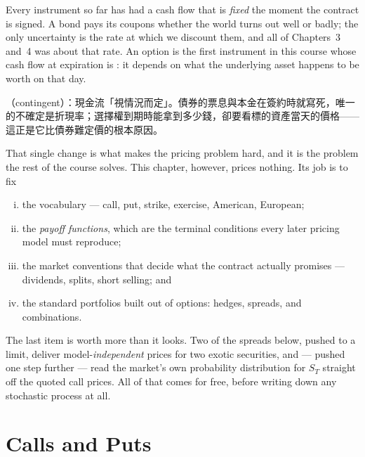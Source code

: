 \bigskip

\suppstart
\noindent Every instrument so far has had a cash flow that is \emph{fixed} the moment the contract is signed.
A bond pays its coupons whether the world turns out well or badly; the only uncertainty is the rate at which we discount them, and all of Chapters~3 and~4 was about that rate.
An option is the first instrument in this course whose cash flow at expiration is : it depends on what the underlying asset happens to be worth on that day.

\begin{remark}
	（contingent）：現金流「視情況而定」。債券的票息與本金在簽約時就寫死，唯一的不確定是折現率；選擇權到期時能拿到多少錢，卻要看標的資產當天的價格——這正是它比債券難定價的根本原因。
\end{remark}

That single change is what makes the pricing problem hard, and it is the problem the rest of the course solves.
This chapter, however, prices nothing.
Its job is to fix
\begin{enumerate}[(i)]
	\item the vocabulary --- call, put, strike, exercise, American, European;
	\item the \emph{payoff functions}, which are the terminal conditions every later pricing model must reproduce;
	\item the market conventions that decide what the contract actually promises --- dividends, splits, short selling; and
	\item the standard portfolios built out of options: hedges, spreads, and combinations.
\end{enumerate}
The last item is worth more than it looks.
Two of the spreads below, pushed to a limit, deliver model-\emph{independent} prices for two exotic securities, and --- pushed one step further --- read the market's own probability distribution for $S_{T}$ straight off the quoted call prices.
All of that comes for free, before writing down any stochastic process at all.
\suppend

\section{Calls and Puts}
\label{sec:calls-puts}


